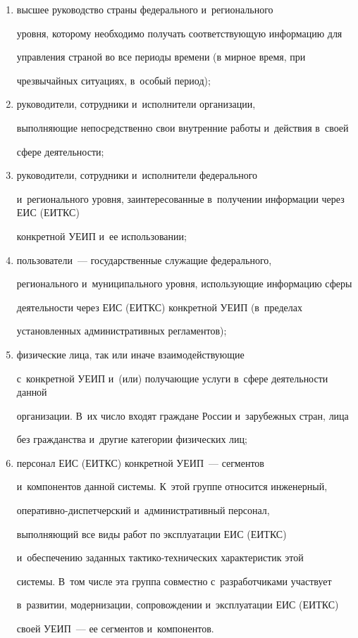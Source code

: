      \begin{enumerate}[(1)]

     \item высшее руководство страны федерального и~регионального 

уровня, которому необходимо получать соответствующую информацию для 

управления страной во все периоды времени (в мирное время, при 

чрезвычайных ситуациях, в~особый период);

     \item руководители, сотрудники и~исполнители организации, 

выполняющие непосредственно свои внутренние работы и~действия в~своей 

сфере деятельности;

     \item руководители, сотрудники и~исполнители федерального 

     и~регионального уровня, заинтересованные в~получении информации через ЕИС (ЕИТКС) 

конкретной УЕИП и~ее использовании;

     \item пользователи~--- государственные служащие федерального, 

регионального и~муниципального уровня, использующие информацию сферы 

де\-я\-тель\-ности через ЕИС (ЕИТКС) конкретной УЕИП (в~пределах 

установленных административных регламентов);

     \item физические лица, так или иначе взаимодействующие 

     с~конкретной УЕИП и~(или) получающие услуги в~сфере деятельности данной 

организации. В~их число входят граждане России и~зарубежных стран, лица 

без гражданства и~другие категории физических лиц;

     \item персонал ЕИС (ЕИТКС) конкретной УЕИП~--- сегментов 

и~компонентов данной системы. К~этой группе относится инженерный,  

опе\-ра\-тив\-но-дис\-пет\-чер\-ский и~административный персонал, 

выполняющий все виды работ по эксплуатации ЕИС (ЕИТКС) 

и~обеспечению заданных так\-ти\-ко-тех\-ни\-че\-ских характеристик этой 

системы. В~том числе эта группа совместно с~разработчиками участвует 

в~развитии, модернизации, сопровождении и~эксплуатации ЕИС (ЕИТКС) 

своей УЕИП~--- ее сегментов и~компонентов.

{



}



     \end{enumerate}

